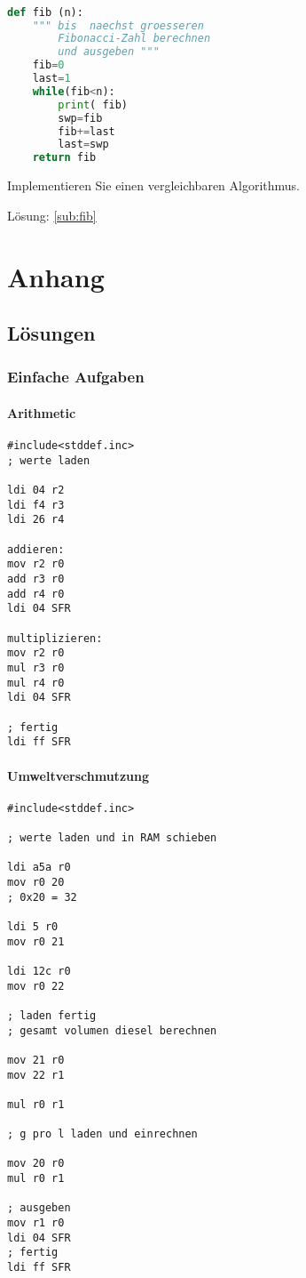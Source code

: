 \documentclass[a4paper,12pt,oneside]{scrreprt}
\begin{document}
\begin{lstlisting}[language=python]

def fib (n):
	""" bis  naechst groesseren 
		Fibonacci-Zahl berechnen 
		und ausgeben """
	fib=0
	last=1
	while(fib<n):
		print( fib)
		swp=fib
		fib+=last
		last=swp
	return fib

\end{lstlisting}

Implementieren Sie einen vergleichbaren Algorithmus.

Lösung: \ref{sub:fib}

\part{Anhang}

\chapter{Lösungen}

\section{Einfache Aufgaben}

\subsection{Arithmetic}
\label{sub:arith}

\begin{lstlisting}
#include<stddef.inc>
; werte laden

ldi 04 r2
ldi f4 r3
ldi 26 r4

addieren:
mov r2 r0
add r3 r0
add r4 r0
ldi 04 SFR

multiplizieren:
mov r2 r0
mul r3 r0
mul r4 r0
ldi 04 SFR

; fertig
ldi ff SFR

\end{lstlisting}

\subsection{Umweltverschmutzung}
\label{sub:umwelt}

\begin{lstlisting}
#include<stddef.inc>

; werte laden und in RAM schieben

ldi a5a r0
mov r0 20
; 0x20 = 32

ldi 5 r0
mov r0 21

ldi 12c r0
mov r0 22

; laden fertig
; gesamt volumen diesel berechnen

mov 21 r0
mov 22 r1

mul r0 r1

; g pro l laden und einrechnen

mov 20 r0
mul r0 r1

; ausgeben
mov r1 r0
ldi 04 SFR
; fertig
ldi ff SFR

\end{lstlisting}
\end{document}
